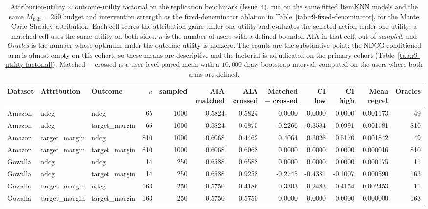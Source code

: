 \begin{table}[!htbp]\centering\scriptsize\setlength{\tabcolsep}{3pt}
\caption{Attribution-utility $\times$ outcome-utility factorial on the replication benchmark (Issue~4), run on the same fitted ItemKNN models and the same $M_{\mathrm{pair}}=250$ budget and intervention strength as the fixed-denominator ablation in Table~\ref{tab:r9-fixed-denominator}, for the Monte Carlo Shapley attribution. Each cell scores the attribution game under one utility and evaluates the selected action under one utility; a matched cell uses the same utility on both sides. $n$ is the number of users with a defined bounded AIA in that cell, out of \emph{sampled}, and \emph{Oracles} is the number whose optimum under the outcome utility is nonzero. The counts are the substantive point: the NDCG-conditioned arm is almost empty on this cohort, so these means are descriptive and the factorial is adjudicated on the primary cohort (Table~\ref{tab:r9-utility-factorial}). Matched $-$ crossed is a user-level paired mean with a $10{,}000$-draw bootstrap interval, computed on the users where both arms are defined.}
\label{tab:r9-utility-factorial-replication}
\begin{tabular}{@{}lllrrrrrrrrr@{}}
\toprule
Dataset & Attribution & Outcome & $n$ & sampled & AIA matched & AIA crossed & Matched $-$ crossed & CI low & CI high & Mean regret & Oracles \\
\midrule
Amazon & ndcg & ndcg & 65 & 1000 & 0.5824 & 0.5824 & 0.0000 & 0.0000 & 0.0000 & 0.001173 & 49 \\
Amazon & ndcg & target_margin & 65 & 1000 & 0.5824 & 0.6873 & -0.2266 & -0.3584 & -0.0991 & 0.001781 & 810 \\
Amazon & target_margin & ndcg & 810 & 1000 & 0.6068 & 0.4462 & 0.4064 & 0.3026 & 0.5170 & 0.001842 & 49 \\
Amazon & target_margin & target_margin & 810 & 1000 & 0.6068 & 0.6068 & 0.0000 & 0.0000 & 0.0000 & 0.000016 & 810 \\
Gowalla & ndcg & ndcg & 14 & 250 & 0.6588 & 0.6588 & 0.0000 & 0.0000 & 0.0000 & 0.000175 & 11 \\
Gowalla & ndcg & target_margin & 14 & 250 & 0.6588 & 0.9258 & -0.2745 & -0.4381 & -0.1007 & 0.000590 & 163 \\
Gowalla & target_margin & ndcg & 163 & 250 & 0.5750 & 0.4186 & 0.3303 & 0.2483 & 0.4154 & 0.002453 & 11 \\
Gowalla & target_margin & target_margin & 163 & 250 & 0.5750 & 0.5750 & 0.0000 & 0.0000 & 0.0000 & 0.000000 & 163 \\

\end{tabular}
\end{table}

